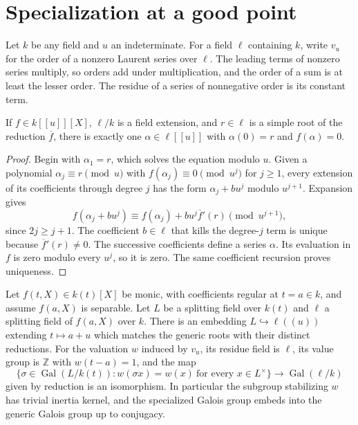 \section{Specialization at a good point}

Let \(k\) be any field and \(u\) an indeterminate. For a field
\(\ell\) containing \(k\), write \(v_u\) for the order of a nonzero
Laurent series over \(\ell\). The leading terms of nonzero
series multiply, so orders add under multiplication, and the order of
a sum is at least the lesser order. The residue of a series of
nonnegative order is its constant term.

\begin{lemma}
\label{res:IG09}
If \(f\in k[[u]][X]\), \(\ell/k\) is a field extension, and
\(r\in\ell\) is a simple root of the reduction \(\overline f\),
there is exactly one \(\alpha\in\ell[[u]]\) with
\(\alpha(0)=r\) and \(f(\alpha)=0\).
\end{lemma}

\begin{proof}
Begin with \(\alpha_1=r\), which solves the equation modulo \(u\).
Given a polynomial \(\alpha_j\equiv r\pmod u\) with
\(f(\alpha_j)\equiv0\pmod{u^j}\) for \(j\geq1\),
every extension of its coefficients through degree \(j\) has
the form \(\alpha_j+b u^j\) modulo \(u^{j+1}\).
Expansion gives
\[
 f(\alpha_j+b u^j)\equiv f(\alpha_j)+b u^j\overline f'(r)
          \pmod{u^{j+1}},
\]
since \(2j\geq j+1\). The coefficient \(b\in\ell\) that kills the
degree-\(j\) term is unique because \(\overline f'(r)\ne0\).
The successive coefficients define a series \(\alpha\).
Its evaluation in \(f\) is zero modulo every \(u^j\), so it
is zero. The same coefficient recursion proves uniqueness.
\end{proof}

\begin{theorem}
\label{res:IG10}
Let \(f(t,X)\in k(t)[X]\) be monic, with coefficients regular at
\(t=a\in k\), and assume \(f(a,X)\) is separable. Let \(L\) be a
splitting field over \(k(t)\) and \(\ell\) a splitting field of
\(f(a,X)\) over \(k\). There is an embedding
\(L\hookrightarrow\ell((u))\) extending \(t\mapsto a+u\)
which matches the generic roots with their distinct reductions.
For the valuation \(w\) induced by \(v_u\), its residue field is
\(\ell\), its value group is \(\mathbb Z\) with \(w(t-a)=1\),
and the map
\[
 \{\sigma\in\operatorname{Gal}(L/k(t)):
           w(\sigma x)=w(x)\ \text{for every }x\in L^\times\}
       \longrightarrow \operatorname{Gal}(\ell/k)
\]
given by reduction is an isomorphism. In particular the subgroup
stabilizing \(w\) has trivial inertia kernel, and the specialized
Galois group embeds into the generic Galois group up to conjugacy.
\end{theorem}

